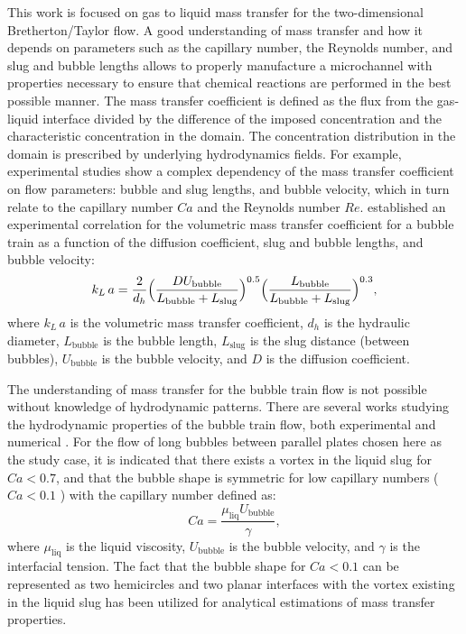 \documentclass[review,12pt]{elsarticle}
\newcommand{\beq}{\begin{equation}}
\newcommand{\feq}{\end{equation}}
\newcommand{\vol}{k_L\,a}
\newcommand{\lbubble}{L_{\mathrm{bubble}}}
\newcommand{\lslug}{L_{\mathrm{slug}}}
\newcommand{\ububble}{U_{\mathrm{bubble}}}
\begin{document}
This work is focused on  gas to liquid mass transfer  for the two-dimensional Bretherton/Taylor flow. A good understanding of mass transfer and how it depends on 
parameters such as the capillary number, the Reynolds number, and slug and bubble lengths allows to properly
manufacture a microchannel with properties necessary to ensure that chemical
reactions are performed in the best possible manner. The mass transfer coefficient is defined as the flux from the 
gas-liquid interface divided by the difference of the imposed concentration and the characteristic concentration in the domain.
 The  concentration distribution in the domain is prescribed by underlying hydrodynamics fields. 
 For example, experimental studies \cite{yue-mass,bercic-mass} show a complex dependency of the mass transfer coefficient on flow parameters:
 bubble and slug lengths, and bubble velocity, which  in turn relate to the capillary number $Ca$ and the Reynolds number $Re$. 
\citet{yue-mass} established an experimental correlation for the volumetric mass transfer coefficient for a bubble train as
a function of the diffusion coefficient, slug and bubble lengths, and bubble velocity: 
\begin{equation}
\vol =\frac{2}{d_h} \Bigl(\frac{D
\ububble}{\lbubble+\lslug}\Bigr)^{0.5}
\Bigl(\frac{\lbubble}{\lbubble+\lslug}\Bigr)^{0.3},
\end{equation}
where $\vol$ is the volumetric mass transfer coefficient, $d_h$ is the hydraulic
diameter, $\lbubble$ is the bubble length, $\lslug$ is the slug distance (between bubbles),
$\ububble$ is the bubble velocity, and $D$ is the diffusion coefficient. 

The understanding of mass transfer for the bubble train flow is not possible without knowledge of hydrodynamic patterns.
There are several works studying the hydrodynamic properties of the bubble train flow, both
experimental \cite{kreutzer-pressure-drop,cerro-space,cerro-bubble-train} and numerical \cite{wang-non-circular,kuzmin-binary3d,giavedoni-numerical,heil-threedim,keskin-hydro}.
 For the flow of long bubbles between parallel plates chosen here as the study case, it is indicated that  there exists a vortex 
in the liquid slug for $Ca<0.7$, %
and that the bubble shape is symmetric for low capillary 
numbers ($Ca<0.1$ \cite{cerro-bubble-train}) with the capillary number defined as:
 \beq
 Ca=\frac{\mu_{\mathrm{liq}} \ububble}{\gamma},
 \feq
 where $\mu_{\mathrm{liq}}$ is the liquid viscosity, $\ububble$ is the bubble velocity, and $\gamma$ is the interfacial tension.
 The fact that the bubble shape for $Ca<0.1$ can be represented as two hemicircles and two planar interfaces with the vortex existing in the liquid slug has been 
utilized for analytical estimations of mass transfer properties.
\end{document}
